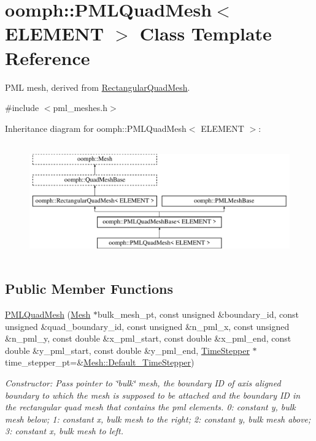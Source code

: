 \hypertarget{classoomph_1_1PMLQuadMesh}{}\section{oomph\+:\+:P\+M\+L\+Quad\+Mesh$<$ E\+L\+E\+M\+E\+NT $>$ Class Template Reference}
\label{classoomph_1_1PMLQuadMesh}


P\+ML mesh, derived from \hyperlink{classoomph_1_1RectangularQuadMesh}{Rectangular\+Quad\+Mesh}.  




{\ttfamily \#include $<$pml\+\_\+meshes.\+h$>$}

Inheritance diagram for oomph\+:\+:P\+M\+L\+Quad\+Mesh$<$ E\+L\+E\+M\+E\+NT $>$\+:\begin{figure}[H]
\begin{center}
\leavevmode
\includegraphics[height=5.000000cm]{classoomph_1_1PMLQuadMesh}
\end{center}
\end{figure}
\subsection*{Public Member Functions}
\begin{DoxyCompactItemize}
\item 
\hyperlink{classoomph_1_1PMLQuadMesh_a7559d700361ed44823a7b2f4be17e6ea}{P\+M\+L\+Quad\+Mesh} (\hyperlink{classoomph_1_1Mesh}{Mesh} $\ast$bulk\+\_\+mesh\+\_\+pt, const unsigned \&boundary\+\_\+id, const unsigned \&quad\+\_\+boundary\+\_\+id, const unsigned \&n\+\_\+pml\+\_\+x, const unsigned \&n\+\_\+pml\+\_\+y, const double \&x\+\_\+pml\+\_\+start, const double \&x\+\_\+pml\+\_\+end, const double \&y\+\_\+pml\+\_\+start, const double \&y\+\_\+pml\+\_\+end, \hyperlink{classoomph_1_1TimeStepper}{Time\+Stepper} $\ast$time\+\_\+stepper\+\_\+pt=\&\hyperlink{classoomph_1_1Mesh_a12243d0fee2b1fcee729ee5a4777ea10}{Mesh\+::\+Default\+\_\+\+Time\+Stepper})
\begin{DoxyCompactList}\small\item\em Constructor\+: Pass pointer to \char`\"{}bulk\char`\"{} mesh, the boundary ID of axis aligned boundary to which the mesh is supposed to be attached and the boundary ID in the rectangular quad mesh that contains the pml elements. 0\+: constant y, bulk mesh below; 1\+: constant x, bulk mesh to the right; 2\+: constant y, bulk mesh above; 3\+: constant x, bulk mesh to left. \end{DoxyCompactList}\end{DoxyCompactItemize}
